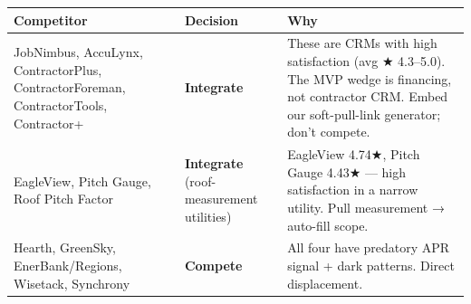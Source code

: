 \documentclass[
  10pt,
]{article}
\begin{document}
\begin{longtable}[]{@{}lll@{}}
\toprule
\begin{minipage}[b]{0.30\columnwidth}\raggedright
Competitor\strut
\end{minipage} & \begin{minipage}[b]{0.30\columnwidth}\raggedright
Decision\strut
\end{minipage} & \begin{minipage}[b]{0.30\columnwidth}\raggedright
Why\strut
\end{minipage}\tabularnewline
\midrule
\endhead
\begin{minipage}[t]{0.30\columnwidth}\raggedright
JobNimbus, AccuLynx, ContractorPlus, ContractorForeman, ContractorTools, Contractor+\strut
\end{minipage} & \begin{minipage}[t]{0.30\columnwidth}\raggedright
\textbf{Integrate}\strut
\end{minipage} & \begin{minipage}[t]{0.30\columnwidth}\raggedright
These are CRMs with high satisfaction (avg ★ 4.3--5.0). The MVP wedge is financing, not contractor
CRM. Embed our soft-pull-link generator; don't compete.\strut
\end{minipage}\tabularnewline
\begin{minipage}[t]{0.30\columnwidth}\raggedright
EagleView, Pitch Gauge, Roof Pitch Factor\strut
\end{minipage} & \begin{minipage}[t]{0.30\columnwidth}\raggedright
\textbf{Integrate} (roof-measurement utilities)\strut
\end{minipage} & \begin{minipage}[t]{0.30\columnwidth}\raggedright
EagleView 4.74★, Pitch Gauge 4.43★ --- high satisfaction in a narrow utility. Pull measurement →
auto-fill scope.\strut
\end{minipage}\tabularnewline
\begin{minipage}[t]{0.30\columnwidth}\raggedright
Hearth, GreenSky, EnerBank/Regions, Wisetack, Synchrony\strut
\end{minipage} & \begin{minipage}[t]{0.30\columnwidth}\raggedright
\textbf{Compete}\strut
\end{minipage} & \begin{minipage}[t]{0.30\columnwidth}\raggedright
All four have predatory APR signal + dark patterns. Direct displacement.\strut
\end{minipage}\tabularnewline

\end{longtable}
\end{document}
